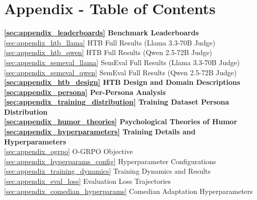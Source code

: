 \documentclass[11pt]{article}
\begin{document}
\section*{Appendix - Table of Contents}
\noindent
\textbf{\ref{sec:appendix_leaderboards} Benchmark Leaderboards} \dotfill \pageref{sec:appendix_leaderboards}\\
\quad\ref{sec:appendix_htb_llama} HTB Full Results (Llama 3.3-70B Judge) \dotfill \pageref{sec:appendix_htb_llama}\\
\quad\ref{sec:appendix_htb_qwen} HTB Full Results (Qwen 2.5-72B Judge) \dotfill \pageref{sec:appendix_htb_qwen}\\
\quad\ref{sec:appendix_semeval_llama} SemEval Full Results (Llama 3.3-70B Judge) \dotfill \pageref{sec:appendix_semeval_llama}\\
\quad\ref{sec:appendix_semeval_qwen} SemEval Full Results (Qwen 2.5-72B Judge) \dotfill \pageref{sec:appendix_semeval_qwen}\\[0.5ex]
\textbf{\ref{sec:appendix_htb_design} HTB Design and Domain Descriptions} \dotfill \pageref{sec:appendix_htb_design}\\[0.5ex]
\textbf{\ref{sec:appendix_persona} Per-Persona Analysis} \dotfill \pageref{sec:appendix_persona}\\
\textbf{\ref{sec:appendix_training_distribution} Training Dataset Persona Distribution} \dotfill \pageref{sec:appendix_training_distribution}\\[0.5ex]
\textbf{\ref{sec:appendix_humor_theories} Psychological Theories of Humor} \dotfill \pageref{sec:appendix_humor_theories}\\[0.5ex]
\textbf{\ref{sec:appendix_hyperparameters} Training Details and Hyperparameters} \dotfill \pageref{sec:appendix_hyperparameters}\\
\quad\ref{sec:appendix_ogrpo} O-GRPO Objective \dotfill \pageref{sec:appendix_ogrpo}\\
\quad\ref{sec:appendix_hyperparams_config} Hyperparameter Configurations \dotfill \pageref{sec:appendix_hyperparams_config}\\
\quad\ref{sec:appendix_training_dynamics} Training Dynamics and Results \dotfill \pageref{sec:appendix_training_dynamics}\\
\quad\ref{sec:appendix_eval_loss} Evaluation Loss Trajectories \dotfill \pageref{sec:appendix_eval_loss}\\
\quad\ref{sec:appendix_comedian_hyperparams} Comedian Adaptation Hyperparameters \dotfill \pageref{sec:appendix_comedian_hyperparams}\\[0.5ex]
\end{document}
